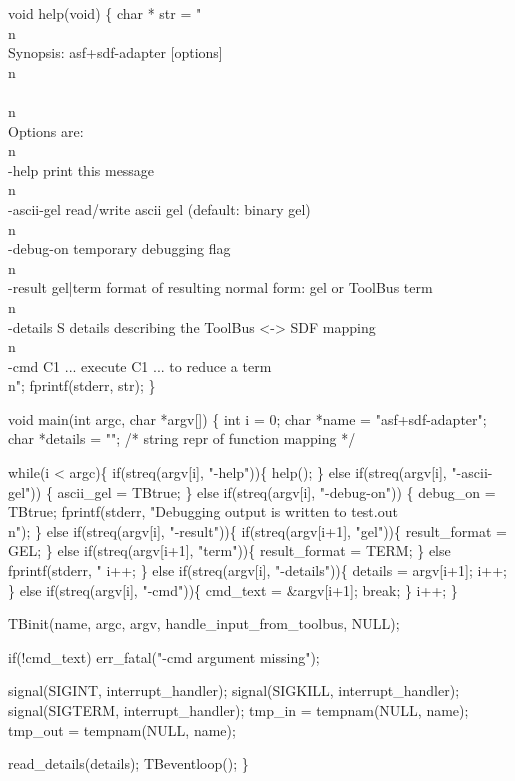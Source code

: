 void help(void)
\{
  char * str =
"\\n\\
Synopsis: asf+sdf-adapter [options]\\n\\
\\n\\
Options are:\\n\\
-help                 print this message\\n\\
-ascii-gel            read/write ascii gel (default: binary gel)\\n\\
-debug-on             temporary debugging flag\\n\\
-result gel|term      format of resulting normal form: gel or ToolBus term\\n\\
-details S            details describing the ToolBus <-> SDF mapping\\n\\
-cmd C1 ...           execute C1 ... to reduce a term\\n";
  fprintf(stderr, str);
\}

void main(int argc, char *argv[])
\{
  int i = 0;
  char *name = "asf+sdf-adapter";
  char *details = "";         /* string repr of function mapping */

  while(i < argc)\{
    if(streq(argv[i], "-help"))\{
      help();  
    \} else if(streq(argv[i], "-ascii-gel")) \{
      ascii_gel = TBtrue;
    \} else if(streq(argv[i], "-debug-on")) \{
      debug_on = TBtrue;
      fprintf(stderr, "Debugging output is written to test.out\\n");
    \} else if(streq(argv[i], "-result"))\{
      if(streq(argv[i+1], "gel"))\{
        result_format = GEL;
      \} else if(streq(argv[i+1], "term"))\{
        result_format = TERM;
      \} else
        fprintf(stderr, "%
      i++;
    \} else if(streq(argv[i], "-details"))\{
      details = argv[i+1]; i++;
    \} else if(streq(argv[i], "-cmd"))\{
      cmd_text = &argv[i+1];
      break;
    \}
    i++;
  \} 

  TBinit(name, argc, argv, handle_input_from_toolbus, NULL);

  if(!cmd_text)
    err_fatal("-cmd argument missing");

  signal(SIGINT, interrupt_handler);
  signal(SIGKILL, interrupt_handler);
  signal(SIGTERM, interrupt_handler);
  tmp_in = tempnam(NULL, name); 
  tmp_out = tempnam(NULL, name);

  read_details(details);
  TBeventloop();
\}
\nwendcode{}

%
\nwdocspar
\nwenddocs{}
